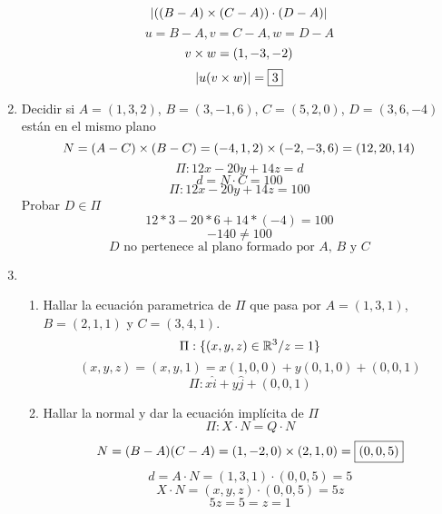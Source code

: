 \documentclass[../practica.root.tex]{subfiles}
\begin{document}
\begin{enumerate}
          \[ | ((B-A)\times(C-A))\cdot(D-A) | \]
          \[ u = B - A, v = C - A, w = D - A \]
          \[ v\times w = (1, -3, -2) \]
          \[ | u(v \times w) | = \boxed{3} \]

    \item Decidir si $A = (1,3,2)$, $B = (3,-1,6)$, $C = (5,2,0)$, $D = (3,6,-4)$ están en el mismo plano
          \[ N = (A-C) \times (B-C) = (-4,1,2) \times (-2,-3,6) = (12,20,14) \]
          \[ \Pi: 12x - 20y + 14z = d \]
          \[ d = N \cdot C = 100 \]
          \[ \Pi: 12x - 20y + 14z = 100 \]
          Probar $D \in \Pi$
          \[ 12*3 - 20*6 + 14*(-4) = 100 \]
          \[ -140 \neq 100 \]
          \[ \boxed{\text{$D$ no pertenece al plano formado por $A$, $B$ y $C$}} \]


    \item \begin{enumerate}
              \item Hallar la ecuación parametrica de $\Pi$ que pasa por $A = (1, 3, 1)$, $B = (2, 1, 1)$ y $C = (3, 4, 1)$.
                    \[ \Pi : \{(x, y, z) \in \mathbb{R}^3 / z = 1\} \]
                    \[ (x, y, z) = (x, y, 1) = x(1, 0, 0) + y(0, 1, 0) + (0, 0, 1) \]
                    \[ \boxed{\Pi : x\hat{i} + y\hat{j} + (0, 0, 1)} \]

              \item Hallar la normal y dar la ecuación implícita de $\Pi$
                    \[ \Pi : X \cdot N = Q \cdot N \]
                    \[ N = (B-A)(C-A) = (1,-2,0)\times(2,1,0) = \boxed{(0, 0, 5)} \]
                    \[ d = A \cdot N = (1, 3, 1)\cdot(0, 0, 5) = 5\]
                    \[ X \cdot N = (x, y, z)\cdot(0, 0, 5) = 5z \]
                    \[ 5z = 5 = \boxed{z = 1} \]

          \end{enumerate}


\end{enumerate}
\end{document}
